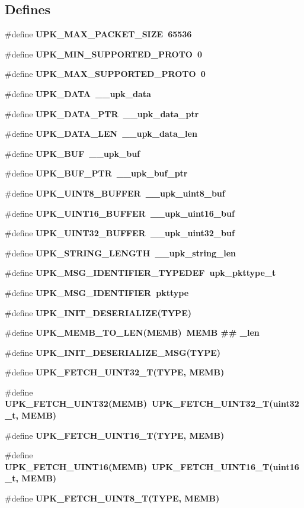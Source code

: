 \subsection*{Defines}
\begin{CompactItemize}
\item 
\#define \bf{UPK\_\-MAX\_\-PACKET\_\-SIZE}~65536
\item 
\#define \bf{UPK\_\-MIN\_\-SUPPORTED\_\-PROTO}~0
\item 
\#define \bf{UPK\_\-MAX\_\-SUPPORTED\_\-PROTO}~0
\item 
\#define \bf{UPK\_\-DATA}~\_\-\_\-upk\_\-data
\item 
\#define \bf{UPK\_\-DATA\_\-PTR}~\_\-\_\-upk\_\-data\_\-ptr
\item 
\#define \bf{UPK\_\-DATA\_\-LEN}~\_\-\_\-upk\_\-data\_\-len
\item 
\#define \bf{UPK\_\-BUF}~\_\-\_\-upk\_\-buf
\item 
\#define \bf{UPK\_\-BUF\_\-PTR}~\_\-\_\-upk\_\-buf\_\-ptr
\item 
\#define \bf{UPK\_\-UINT8\_\-BUFFER}~\_\-\_\-upk\_\-uint8\_\-buf
\item 
\#define \bf{UPK\_\-UINT16\_\-BUFFER}~\_\-\_\-upk\_\-uint16\_\-buf
\item 
\#define \bf{UPK\_\-UINT32\_\-BUFFER}~\_\-\_\-upk\_\-uint32\_\-buf
\item 
\#define \bf{UPK\_\-STRING\_\-LENGTH}~\_\-\_\-upk\_\-string\_\-len
\item 
\#define \bf{UPK\_\-MSG\_\-IDENTIFIER\_\-TYPEDEF}~\bf{upk\_\-pkttype\_\-t}
\item 
\#define \bf{UPK\_\-MSG\_\-IDENTIFIER}~pkttype
\item 
\#define \bf{UPK\_\-INIT\_\-DESERIALIZE}(TYPE)
\item 
\#define \bf{UPK\_\-MEMB\_\-TO\_\-LEN}(MEMB)~MEMB \#\# \_\-len
\item 
\#define \bf{UPK\_\-INIT\_\-DESERIALIZE\_\-MSG}(TYPE)
\item 
\#define \bf{UPK\_\-FETCH\_\-UINT32\_\-T}(TYPE, MEMB)
\item 
\#define \bf{UPK\_\-FETCH\_\-UINT32}(MEMB)~UPK\_\-FETCH\_\-UINT32\_\-T(uint32\_\-t, MEMB)
\item 
\#define \bf{UPK\_\-FETCH\_\-UINT16\_\-T}(TYPE, MEMB)
\item 
\#define \bf{UPK\_\-FETCH\_\-UINT16}(MEMB)~UPK\_\-FETCH\_\-UINT16\_\-T(uint16\_\-t, MEMB)
\item 
\#define \bf{UPK\_\-FETCH\_\-UINT8\_\-T}(TYPE, MEMB)
\item 

\end{CompactItemize}
